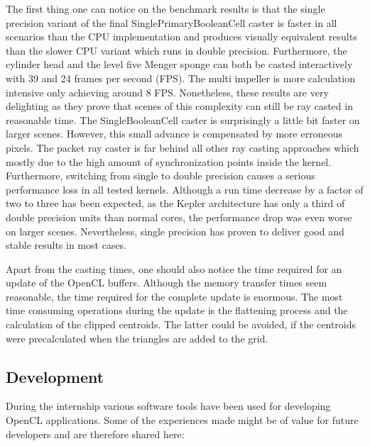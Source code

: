 The first thing one can notice on the benchmark results is that the single precision variant of the final SinglePrimaryBooleanCell caster is faster in all scenarios than the CPU implementation and produces visually equivalent results than the slower CPU variant which runs in double precision. Furthermore, the cylinder head and the level five Menger sponge can both be casted interactively with 39 and 24 frames per second (FPS). The multi impeller is more calculation intensive only achieving around 8 FPS. Nonetheless, these results are very delighting as they prove that scenes of this complexity can still be ray casted in reasonable time. The SingleBooleanCell caster is surprisingly a little bit faster on larger scenes. However, this small advance is compensated by more erroneous pixels. The packet ray caster is far behind all other ray casting approaches which mostly due to the high amount of synchronization points inside the kernel. Furthermore, switching from single to double precision causes a serious performance loss in all tested kernels. Although a run time decrease by a factor of two to three has been expected, as the Kepler architecture has only a third of double precision units than normal cores, the performance drop was even worse on larger scenes. Nevertheless, single precision has proven to deliver good and stable results in most cases.

Apart from the casting times, one should also notice the time required for an update of the OpenCL buffers. Although the memory transfer times seem reasonable, the time required for the complete update is enormous. The most time consuming operations during the update is the flattening process and the calculation of the clipped centroids. The latter could be avoided, if the centroids were precalculated when the triangles are added to the grid.

\subsection{Development}

During the internship various software tools have been used for developing OpenCL applications. Some of the experiences made might be of value for future developers and are therefore shared here:

